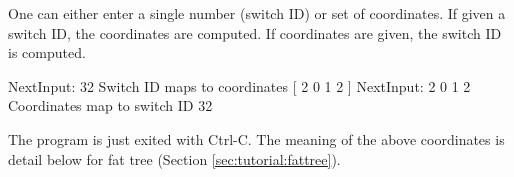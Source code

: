 One can either enter a single number (switch ID) or set of coordinates.
If given a switch ID, the coordinates are computed.
If coordinates are given, the switch ID is computed.

\begin{ShellCmd}
NextInput: 32
Switch ID maps to coordinates [ 2 0 1 2 ]
NextInput: 2 0 1 2
Coordinates map to switch ID 32
\end{ShellCmd}

The program is just exited with Ctrl-C.
The meaning of the above coordinates is detail below for fat tree (Section \ref{sec:tutorial:fattree}).








